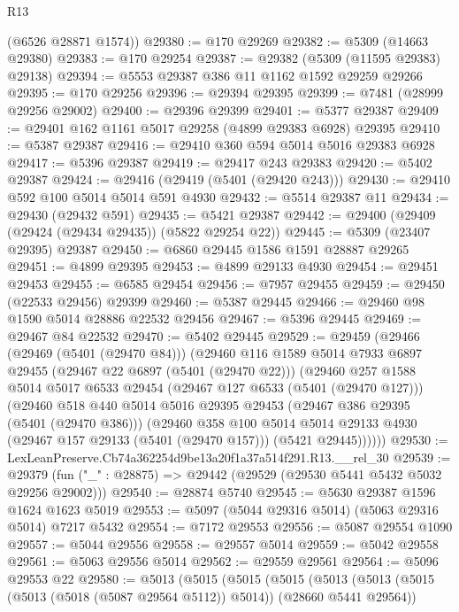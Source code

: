 \begin{lexlean}{R13}
\begin{coremodule}
      (@6526 @28871 @1574))
@29380 := @170 @29269
@29382 := @5309 (@14663 @29380)
@29383 := @170 @29254
@29387 := @29382 (@5309 (@11595 @29383) @29138)
@29394 := @5553 @29387 @386 @11 @1162 @1592 @29259 @29266
@29395 := @170 @29256
@29396 := @29394 @29395
@29399 := @7481 (@28999 @29256 @29002)
@29400 := @29396 @29399
@29401 := @5377 @29387
@29409 := @29401 @162 @1161 @5017 @29258 (@4899 @29383 @6928) @29395
@29410 := @5387 @29387
@29416 := @29410 @360 @594 @5014 @5016 @29383 @6928
@29417 := @5396 @29387
@29419 := @29417 @243 @29383
@29420 := @5402 @29387
@29424 := @29416 (@29419 (@5401 (@29420 @243)))
@29430 := @29410 @592 @100 @5014 @5014 @591 @4930
@29432 := @5514 @29387 @11
@29434 := @29430 (@29432 @591)
@29435 := @5421 @29387
@29442 := @29400 (@29409 (@29424 (@29434 @29435)) (@5822 @29254 @22))
@29445 := @5309 (@23407 @29395) @29387
@29450 := @6860 @29445 @1586 @1591 @28887 @29265
@29451 := @4899 @29395
@29453 := @4899 @29133 @4930
@29454 := @29451 @29453
@29455 := @6585 @29454
@29456 := @7957 @29455
@29459 := @29450 (@22533 @29456) @29399
@29460 := @5387 @29445
@29466 := @29460 @98 @1590 @5014 @28886 @22532 @29456
@29467 := @5396 @29445
@29469 := @29467 @84 @22532
@29470 := @5402 @29445
@29529 := @29459
    (@29466
      (@29469 (@5401 (@29470 @84)))
      (@29460
        @116
        @1589
        @5014
        @7933
        @6897
        @29455
        (@29467 @22 @6897 (@5401 (@29470 @22)))
        (@29460
          @257
          @1588
          @5014
          @5017
          @6533
          @29454
          (@29467 @127 @6533 (@5401 (@29470 @127)))
          (@29460
            @518
            @440
            @5014
            @5016
            @29395
            @29453
            (@29467 @386 @29395 (@5401 (@29470 @386)))
            (@29460
              @358
              @100
              @5014
              @5014
              @29133
              @4930
              (@29467 @157 @29133 (@5401 (@29470 @157)))
              (@5421 @29445))))))
@29530 := LexLeanPreserve.Cb74a362254d9be13a20f1a37a514f291.R13.__rel_30
@29539 := @29379 (fun ("_" : @28875) => @29442 (@29529 (@29530 @5441 @5432 @5032 @29256 @29002)))
@29540 := @28874 @5740
@29545 := @5630 @29387 @1596 @1624 @1623 @5019
@29553 := @5097 (@5044 @29316 @5014) (@5063 @29316 @5014) @7217 @5432
@29554 := @7172 @29553
@29556 := @5087 @29554 @1090
@29557 := @5044 @29556
@29558 := @29557 @5014
@29559 := @5042 @29558
@29561 := @5063 @29556 @5014
@29562 := @29559 @29561
@29564 := @5096 @29553 @22
@29580 := @5013
    (@5015
      (@5015
        (@5015
          (@5013
            (@5013 (@5015 (@5013 (@5018 (@5087 @29564 @5112)) @5014)) (@28660 @5441 @29564))

\end{coremodule}
\end{lexlean}
